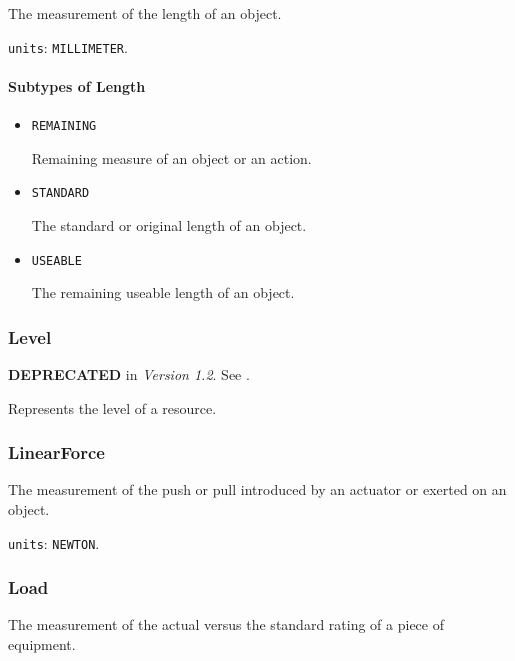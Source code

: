 The measurement of the length of an object.


\texttt{units}: \texttt{MILLIMETER}.

\paragraph{Subtypes of Length}\mbox{}
\label{sec:Subtypes of Length}

\begin{itemize}

\item \texttt{REMAINING}


Remaining measure of an object or an action.

\item \texttt{STANDARD}


The standard or original length of an object.

\item \texttt{USEABLE}


The remaining useable length of an object.


\end{itemize}






\subsubsection{Level}
\label{sec:Level}



\textbf{DEPRECATED} in \textit{Version 1.2}.  See .

Represents the level of a resource.



\subsubsection{LinearForce}
\label{sec:LinearForce}



The measurement of the push or pull introduced by an actuator or exerted on an object.


\texttt{units}: \texttt{NEWTON}.


\subsubsection{Load}
\label{sec:Load}



The measurement of the actual versus the standard rating of a piece of equipment.


